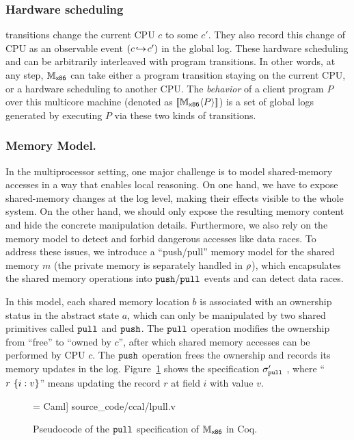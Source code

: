 \subsubsection{Hardware scheduling} 
transitions  change the
current CPU \allid{} $c$ to some  \allid{} $c'$. 
They also record this 
change of CPU \allid{} as an observable event $(c \!\hookrightarrow\! c')$ in the global log.
These hardware scheduling
and can be arbitrarily interleaved with
program transitions.
In other words, at any step,
$\mathbb{M}_{\mathsf{x86}}$ can take either a program transition staying
on the current CPU,
or a hardware scheduling to another CPU.
The \emph{behavior} of a client program $P$ over this multicore machine (denoted as $[\![{\mathbb{M}_{\mathsf{x86}}} \langle {P} \rangle]\!]$) is  a set of global logs generated by executing $P$ via these two kinds of transitions.

\subsubsection{Memory Model.}
In the multiprocessor setting,
one major challenge is to model shared-memory accesses
in a way that enables local reasoning.
On one hand, we have to expose shared-memory changes
at the log level, making their effects visible to the whole system.
On the other hand,  we should only expose the resulting memory
content and hide the concrete manipulation details.
Furthermore, we also rely on the memory model
to detect and forbid dangerous accesses like data races.
To address these issues, we introduce
a  ``push/pull'' memory model for the shared memory $m$
(the private memory is separately handled in $\rho$),
which encapsulates the shared memory operations
into ${\mathrm{\texttt{push}}}/{\mathrm{\texttt{pull}}}$ events and can detect data races.

In this model, each shared memory location $b$ is associated
with an ownership status in the abstract state $a$, which can only be manipulated by 
two shared primitives called ${\mathrm{\texttt{pull}}}$ and ${\mathrm{\texttt{push}}}$. The ${\mathrm{\texttt{pull}}}$ operation modifies the ownership from ``free'' to  ``owned by $c$'', after which shared memory accesses
can be performed by CPU $c$. The ${\mathrm{\texttt{push}}}$ operation frees the ownership and records its memory updates in the log.
Figure~\ref{fig:exp:lpull} shows  the specification $\sigma_{\mathrm{\texttt{pull}}}'$
, where ``$r\ \{i:v\}$''
means updating the record $r$ at field $i$ 
with value $v$.


\begin{figure}[t]
 = Caml] {source_code/ccal/lpull.v}
\caption{Pseudocode of the ${\mathrm{\texttt{pull}}}$ specification of $\mathbb{M}_{\mathsf{x86}}$  in Coq.}
\label{fig:exp:lpull}
\end{figure}


